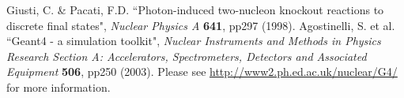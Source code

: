 \documentclass[a4paper,12pt]{article}
\begin{document}
\begin{thebibliography}{99}
 Giusti, C. \& Pacati, F.D. ``Photon-induced two-nucleon knockout reactions to discrete final states", \textit{Nuclear Physics A} \textbf{641}, pp297 (1998).
 Agostinelli, S. et al. ``Geant4 - a simulation toolkit", \textit{Nuclear Instruments and Methods in Physics Research Section A: Accelerators, Spectrometers, Detectors and Associated Equipment} \textbf{506}, pp250 (2003).
 Please see \url{http://www2.ph.ed.ac.uk/nuclear/G4/} for more information.

\end{thebibliography}
\end{document}
